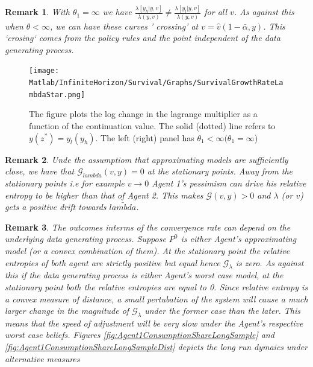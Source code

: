 \documentclass[12pt]{article}
\newtheorem{remark}{Remark}
\begin{document}
\begin{remark}
With $\theta_1=\infty$ we have $\frac{\lambda[y_h|y,v]}{\lambda(y,v)} \neq \frac{\lambda[y_l|y,v]}{\lambda(y,v)} $ for all $v$. As against this when $\theta <\infty$, we can have these curves ' crossing'  at $v=\hat{v}(1-\bar{\alpha},y)$. This `crosing` comes from the policy rules and the point independent of the data generating process.
\end{remark}



\begin{figure}[htbp]
\centering
	  \texttt{[image: Matlab/InfiniteHorizon/Survival/Graphs/SurvivalGrowthRateLambdaStar.png]}
	  \caption{ The figure plots the log change in the lagrange multiplier as a function of the continuation value. The solid (dotted) line refers to$ y(z^*)=y_l (y_h)$. The left (right) panel has $\theta_1<\infty  (\theta_1=\infty $)}	  
\label{fig:SurvivalGrowthRateLambdaStar}
\end{figure}


\begin{remark}
Unde the assumptiom that approximating models are sufficiently close, we have that $\mathcal{G}_{lambda} (v,y) =0 $ at the stationary points. Away from the stationary points i.e for example $v \to 0$ Agent 1's pessimism can drive his relative entropy to be higher than that of Agent 2. This makes $\mathcal{G}(v,y) >0$ and $\lambda$ (or $v$) gets a positive drift towards $\bar{lambda}$.
\end{remark}



\begin{remark}
The outcomes interms of the convergence rate can depend on the underlying data generating process. Suppose $P^0$ is either Agent's approximating model (or a convex combination of them). At the stationary point the relative entropies of both agent are strictly positive but equal hence $\mathcal{G}_{\lambda}$ is zero. As against this if the data generating process is either Agent's worst case model, at the stationary point both the relative entropies are equal to 0. Since relative entropy is a convex measure of distance, a small pertubation of the system will cause a much larger change in the magnitude of $\mathcal{G}_{\lambda}$ under the former case than the later. This means that the speed of adjustment will be very slow under the Agent's respective worst case beliefs.   Figures \ref{fig:Agent1ConsumptionShareLongSample} and \ref{fig:Agent1ConsumptionShareLongSampleDist} depicts the long run dymaics under alternative measures
\end{remark}
\end{document}
